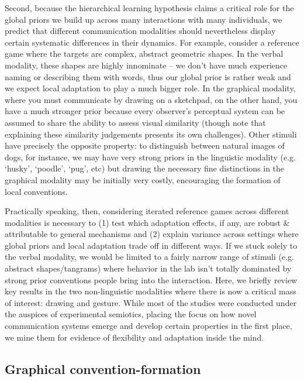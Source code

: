 \documentclass[11pt, floatsintext, man]{apa6}
\begin{document}
Second, because the hierarchical learning hypothesis claims a critical role for the global priors we build up across many interactions with many individuals, we predict that different communication modalities should nevertheless display certain systematic differences in their dynamics. For example, consider a reference game where the targets are complex, abstract geometric shapes. In the verbal modality, these shapes are highly innominate -- we don't have much experience naming or describing them with words, thus our global prior is rather weak and we expect local adaptation to play a much bigger role. In the graphical modality, where you must communicate by drawing on a sketchpad, on the other hand, you have a much stronger prior because every observer's perceptual system can be assumed to share the ability to assess visual similarity (though note that explaining these similarity judgements presents its own challenges). Other stimuli have precisely the opposite property: to distinguish between natural images of dogs, for instance, we may have very strong priors in the linguistic modality (e.g. `husky', `poodle', `pug', etc) but drawing the necessary fine distinctions in the graphical modality may be initially very costly, encouraging the formation of local conventions. 

Practically speaking, then, considering iterated reference games across different modalities is necessary to (1) test which adaptation effects, if any, are robust \& attributable to general mechanisms and (2) explain variance across settings where global priors and local adaptation trade off in different ways. If we stuck solely to the verbal modality, we would be limited to a fairly narrow range of stimuli (e.g. abstract shapes/tangrams) where behavior in the lab isn't totally dominated by strong prior conventions people bring into the interaction. Here, we briefly review key results in the two non-linguistic modalities where there is now a critical mass of interest: drawing and gesture. While most of the studies were conducted under the auspices of experimental semiotics, placing the focus on how novel communication systems emerge and develop certain properties in the first place, we mine them for evidence of flexibility and adaptation inside the mind. 

\subsection{Graphical convention-formation}
\end{document}
